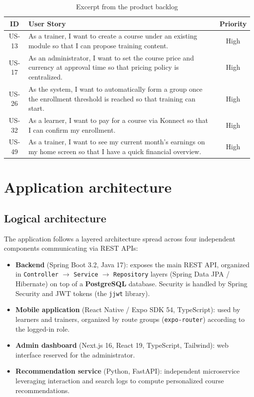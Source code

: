 \documentclass[a4paper,12pt]{report}
\begin{document}
\begin{table}[H]
\centering
\caption{Excerpt from the product backlog}
\label{tab:backlog-extrait}
\begin{tabular}{|c|P{9cm}|c|}
\hline
{}
\textbf{ID} & \textbf{User Story} & \textbf{Priority} \\
\hline
US-13 & As a trainer, I want to create a course under an existing module so that I can propose training content. & High \\
\hline
US-17 & As an administrator, I want to set the course price and currency at approval time so that pricing policy is centralized. & High \\
\hline
US-26 & As the system, I want to automatically form a group once the enrollment threshold is reached so that training can start. & High \\
\hline
US-32 & As a learner, I want to pay for a course via Konnect so that I can confirm my enrollment. & High \\
\hline
US-49 & As a trainer, I want to see my current month's earnings on my home screen so that I have a quick financial overview. & High \\
\hline
\end{tabular}
\end{table}

\section{Application architecture}

\subsection{Logical architecture}
The application follows a layered architecture spread across four
independent components communicating via REST APIs:

\begin{itemize}[leftmargin=*]
  \item \textbf{Backend} (Spring Boot 3.2, Java 17): exposes the main REST
        API, organized in \texttt{Controller} $\rightarrow$
        \texttt{Service} $\rightarrow$ \texttt{Repository} layers (Spring
        Data JPA / Hibernate) on top of a \textbf{PostgreSQL} database.
        Security is handled by Spring Security and JWT tokens (the
        \texttt{jjwt} library).
  \item \textbf{Mobile application} (React Native / Expo SDK 54,
        TypeScript): used by learners and trainers, organized by route
        groups (\texttt{expo-router}) according to the logged-in role.
  \item \textbf{Admin dashboard} (Next.js 16, React 19, TypeScript,
        Tailwind): web interface reserved for the administrator.
  \item \textbf{Recommendation service} (Python, FastAPI): independent
        microservice leveraging interaction and search logs to compute
        personalized course recommendations.
\end{itemize}
\end{document}

